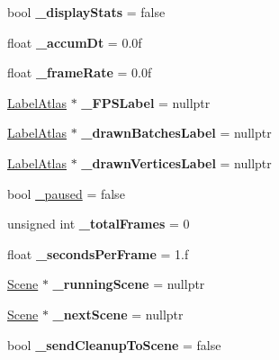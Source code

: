 \begin{DoxyCompactItemize}
bool {\bfseries \+\_\+display\+Stats} = false
\item 
\mbox{\label{classDirector_a5b0fb4561388d8b48a3c1b9c8e3e05bd}} 
float {\bfseries \+\_\+accum\+Dt} = 0.\+0f
\item 
\mbox{\label{classDirector_a74601d493caa29aee2400a2108309a9b}} 
float {\bfseries \+\_\+frame\+Rate} = 0.\+0f
\item 
\mbox{\label{classDirector_a5cdefe937558b082a53d635d908ce8d0}} 
\hyperlink{classLabelAtlas}{Label\+Atlas} $\ast$ {\bfseries \+\_\+\+F\+P\+S\+Label} = nullptr
\item 
\mbox{\label{classDirector_abb91c905da7534a8b3bffc4cd4a09baa}} 
\hyperlink{classLabelAtlas}{Label\+Atlas} $\ast$ {\bfseries \+\_\+drawn\+Batches\+Label} = nullptr
\item 
\mbox{\label{classDirector_aa20b71b7db373bf41768052c984abf40}} 
\hyperlink{classLabelAtlas}{Label\+Atlas} $\ast$ {\bfseries \+\_\+drawn\+Vertices\+Label} = nullptr
\item 
bool \hyperlink{classDirector_a672d832da8045559f18ff63302ac2aee}{\+\_\+paused} = false
\item 
\mbox{\label{classDirector_a1ad2c2ced0469c495dbc1c1c507d0d82}} 
unsigned int {\bfseries \+\_\+total\+Frames} = 0
\item 
\mbox{\label{classDirector_ab8c8de2ca7e4b6c21b373b624e11e18b}} 
float {\bfseries \+\_\+seconds\+Per\+Frame} = 1.f
\item 
\mbox{\label{classDirector_ad5eba21a843e5ad14950d371ebccd4a1}} 
\hyperlink{classScene}{Scene} $\ast$ {\bfseries \+\_\+running\+Scene} = nullptr
\item 
\mbox{\label{classDirector_a8a293bc1148434a61bf5bd9149fa2dfb}} 
\hyperlink{classScene}{Scene} $\ast$ {\bfseries \+\_\+next\+Scene} = nullptr
\item 
\mbox{\label{classDirector_a4eb64ee569dbf0a318e10a453dd4a4c1}} 
bool {\bfseries \+\_\+send\+Cleanup\+To\+Scene} = false
\item 

\end{DoxyCompactItemize}
